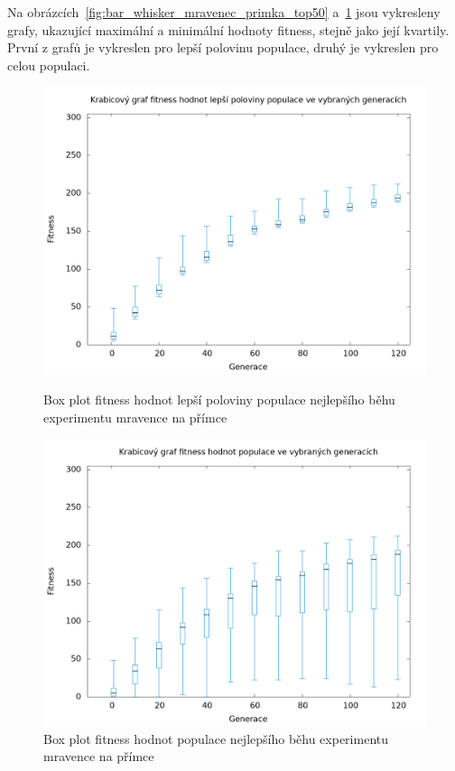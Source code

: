 Na obrázcích~\ref{fig:bar_whisker_mravenec_primka_top50} a~\ref{fig:bar_whisker_mravenec_primka} jsou vykresleny grafy, ukazující maximální a minimální hodnoty fitness, stejně jako její kvartily.
První z grafů je vykreslen pro lepší polovinu populace, druhý je vykreslen pro celou populaci.

\begin{figure}[h]
    \begin{minipage}[c]{0.48\linewidth}
        \includegraphics[width=\linewidth]{obrazky/bar_whisker_mravenec_primka_top50.png}
        \caption{Box plot fitness hodnot lepší poloviny populace nejlepšího běhu experimentu mravence na přímce}
        \label{fig:bar_whisker_mravenec_primka_top50}
    \end{minipage}
    \hfill
    \begin{minipage}[c]{0.48\linewidth}
        \includegraphics[width=\linewidth]{obrazky/bar_whisker_mravenec_primka.png}
        \caption{Box plot fitness hodnot populace nejlepšího běhu experimentu mravence na přímce}
        \label{fig:bar_whisker_mravenec_primka}
    \end{minipage}
\end{figure}

